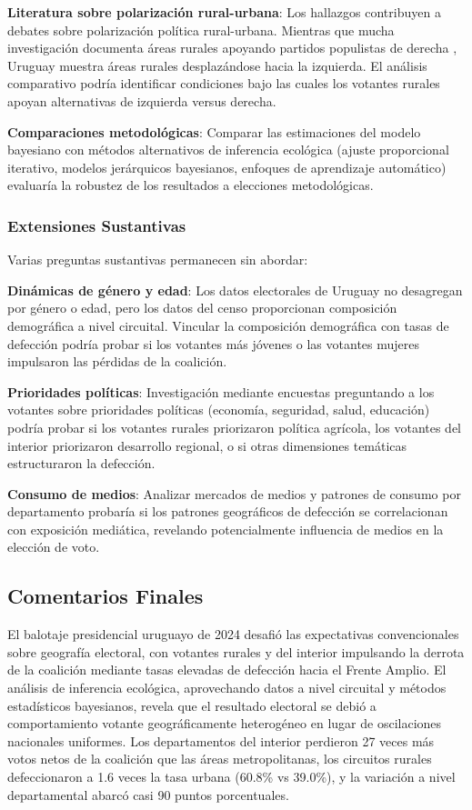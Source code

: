 \textbf{Literatura sobre polarización rural-urbana}: Los hallazgos contribuyen a debates sobre polarización política rural-urbana. Mientras que mucha investigación documenta áreas rurales apoyando partidos populistas de derecha \citep{rodden2019s}, Uruguay muestra áreas rurales desplazándose hacia la izquierda. El análisis comparativo podría identificar condiciones bajo las cuales los votantes rurales apoyan alternativas de izquierda versus derecha.

\textbf{Comparaciones metodológicas}: Comparar las estimaciones del modelo bayesiano con métodos alternativos de inferencia ecológica (ajuste proporcional iterativo, modelos jerárquicos bayesianos, enfoques de aprendizaje automático) evaluaría la robustez de los resultados a elecciones metodológicas.

\subsubsection{Extensiones Sustantivas}

Varias preguntas sustantivas permanecen sin abordar:

\textbf{Dinámicas de género y edad}: Los datos electorales de Uruguay no desagregan por género o edad, pero los datos del censo proporcionan composición demográfica a nivel circuital. Vincular la composición demográfica con tasas de defección podría probar si los votantes más jóvenes o las votantes mujeres impulsaron las pérdidas de la coalición.

\textbf{Prioridades políticas}: Investigación mediante encuestas preguntando a los votantes sobre prioridades políticas (economía, seguridad, salud, educación) podría probar si los votantes rurales priorizaron política agrícola, los votantes del interior priorizaron desarrollo regional, o si otras dimensiones temáticas estructuraron la defección.

\textbf{Consumo de medios}: Analizar mercados de medios y patrones de consumo por departamento probaría si los patrones geográficos de defección se correlacionan con exposición mediática, revelando potencialmente influencia de medios en la elección de voto.

\subsection{Comentarios Finales}
\label{sec:discusion_conclusion}

El balotaje presidencial uruguayo de 2024 desafió las expectativas convencionales sobre geografía electoral, con votantes rurales y del interior impulsando la derrota de la coalición mediante tasas elevadas de defección hacia el Frente Amplio. El análisis de inferencia ecológica, aprovechando datos a nivel circuital y métodos estadísticos bayesianos, revela que el resultado electoral se debió a comportamiento votante geográficamente heterogéneo en lugar de oscilaciones nacionales uniformes. Los departamentos del interior perdieron 27 veces más votos netos de la coalición que las áreas metropolitanas, los circuitos rurales defeccionaron a 1.6 veces la tasa urbana (60.8\% vs 39.0\%), y la variación a nivel departamental abarcó casi 90 puntos porcentuales.

